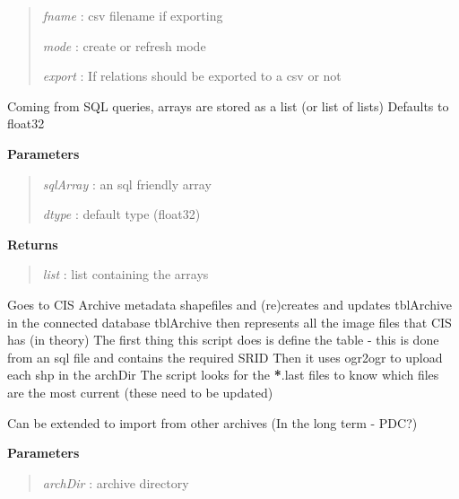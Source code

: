 \documentclass[letterpaper,10pt,openany,oneside]{sphinxmanual}
\begin{document}
\begin{fulllineitems}
\begin{fulllineitems}
\begin{quote}
\emph{fname}      : csv filename if exporting

\emph{mode}       : create or refresh mode

\emph{export}     : If relations should be exported to a csv or not
\end{quote}

\end{fulllineitems}


\begin{fulllineitems}
\label{code:Database.Database.sql2numpy}
Coming from SQL queries, arrays are stored as a list (or list of lists)
Defaults to float32

\textbf{Parameters}
\begin{quote}

\emph{sqlArray} : an sql friendly array

\emph{dtype}    : default type (float32)
\end{quote}

\textbf{Returns}
\begin{quote}

\emph{list}     : list containing the arrays
\end{quote}

\end{fulllineitems}


\begin{fulllineitems}
\label{code:Database.Database.updateFromArchive}
Goes to CIS Archive metadata shapefiles and (re)creates and updates tblArchive in the connected database
tblArchive then represents all the image files that CIS has (in theory)
The first thing this script does is define the table - this is done from an sql file and contains the required SRID
Then it uses ogr2ogr to upload each shp in the archDir 
The script looks for the {\color{red}\bfseries{}*}.last files to know which files are the most current (these need to be updated)

Can be extended to import from other archives (In the long term - PDC?)

\textbf{Parameters}
\begin{quote}

\emph{archDir} : archive directory
\end{quote}


\end{fulllineitems}
\end{fulllineitems}
\end{document}
